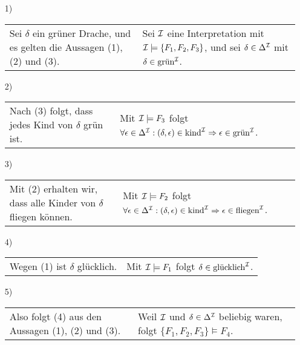 \begin{enumerate}
\item[1)]
\begin{tabular}[t]{p{} p{}}
Sei $\delta$ ein grüner Drache, und es gelten die Aussagen (1), (2) und (3). & Sei $\mathcal{I}$ eine Interpretation mit \newline
$\mathcal{I} \models \{F_1, F_2, F_3 \}$, und sei $\delta \in \Delta^{\mathcal{I}}$ mit $\delta \in \text{grün}^{\mathcal{I}}$.
\end{tabular}
\item[2)]
\begin{tabular}[t]{p{} p{}}
Nach (3) folgt, dass jedes Kind von $\delta$ grün ist. & Mit $\mathcal{I} \models F_3$ folgt \newline
$\forall \epsilon \in \Delta^{\mathcal{I}}: (\delta, \epsilon) \in \text{kind}^{\mathcal{I}} \Rightarrow \epsilon \in \text{grün}^{\mathcal{I}}$.
\end{tabular}
\item[3)]
\begin{tabular}[t]{p{} p{}}
Mit (2) erhalten wir, dass alle Kinder von $\delta$ fliegen können. & Mit $\mathcal{I} \models F_2$ folgt \newline
$\forall \epsilon \in \Delta^{\mathcal{I}}: (\delta, \epsilon) \in \text{kind}^{\mathcal{I}} \Rightarrow \epsilon \in \text{fliegen}^{\mathcal{I}}$.
\end{tabular}
\item[4)]
\begin{tabular}[t]{p{} p{}}
Wegen (1) ist $\delta$ glücklich. & Mit $\mathcal{I} \models F_1$ folgt $\delta \in \text{glücklich}^{\mathcal{I}}$.
\end{tabular}
\item[5)]
\begin{tabular}[t]{p{} p{}}
Also folgt (4) aus den Aussagen (1), (2) und (3). & Weil $\mathcal{I}$ und $\delta \in \Delta^{\mathcal{I}}$ beliebig waren, folgt \newline
$\{F_1, F_2, F_3\} \models F_4$.
\end{tabular}
\end{enumerate}


